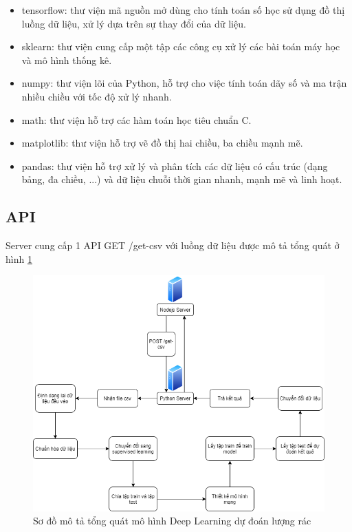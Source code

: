 \begin{itemize}
    \item tensorflow: thư viện mã nguồn mở dùng cho tính toán số học sử dụng đồ thị luồng dữ liệu, xử lý dựa trên sự thay đổi của dữ liệu.
    \item sklearn: thư viện cung cấp một tập các công cụ xử lý các bài toán máy học và mô hình thống kê.
    \item numpy: thư viện lõi của Python, hỗ trợ cho việc tính toán dãy số và ma trận nhiều chiều với tốc độ xử lý nhanh.
    \item math: thư viện hỗ trợ các hàm toán học tiêu chuẩn C.
    \item matplotlib: thư viện hỗ trợ vẽ đồ thị hai chiều, ba chiều mạnh mẽ.
    \item pandas: thư viện hỗ trợ xử lý và phân tích các dữ liệu có cấu trúc (dạng bảng, đa chiều, ...) và dữ liệu chuỗi thời gian nhanh, mạnh mẽ và linh hoạt.
\end{itemize}

\subsection{API}
Server cung cấp 1 API GET /get-csv với luồng dữ liệu được mô tả tổng quát ở hình \ref{fig:python_general}

\begin{figure}[H]
    \centering
    \includegraphics[width=\textwidth]{images/Khanh/Python/Python_general.png}
    \caption{Sơ đồ mô tả tổng quát mô hình Deep Learning dự đoán lượng rác}
    \label{fig:python_general}
\end{figure}

